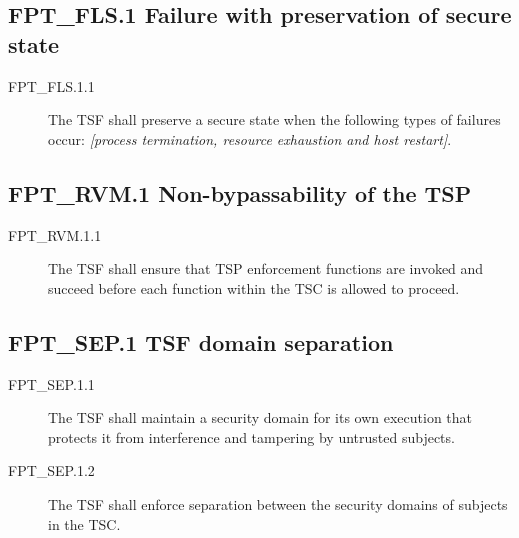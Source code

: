 \documentclass[12pt,english]{scrbook}
\begin{document}



\subsection{FPT{\_}FLS.1 Failure with preservation of secure state}
\begin{description}
\item[FPT{\_}FLS.1.1 ]

The TSF shall preserve a secure state when the following types of
failures occur: \emph{{[}process termination, resource
exhaustion and host restart]}.

\end{description}





\subsection{FPT{\_}RVM.1 Non-bypassability of the TSP}
\begin{description}
\item[FPT{\_}RVM.1.1 ]

The TSF shall ensure that TSP enforcement functions are invoked
and succeed before each function within the TSC is allowed to
proceed.

\end{description}





\subsection{FPT{\_}SEP.1 TSF domain separation}
\begin{description}
\item[FPT{\_}SEP.1.1 ]

The TSF shall maintain a security domain for its own execution that
protects it from interference and tampering by untrusted
subjects.

\item[FPT{\_}SEP.1.2 ]

The TSF shall enforce separation between the
security domains of subjects in the TSC.

\end{description}
\end{document}
